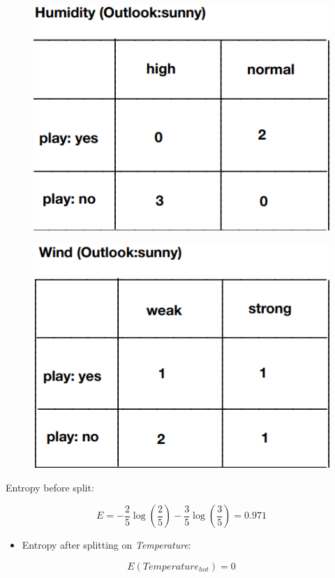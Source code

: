 \documentclass[11pt]{article}
\makeatletter
\def\maxwidth{\ifdim\Gin@nat@width>\linewidth\linewidth
    \else\Gin@nat@width\fi}
\let\Oldincludegraphics\includegraphics
\renewcommand{\includegraphics}[1]{\Oldincludegraphics[width=.8\maxwidth]{#1}}
\providecommand{\tightlist}{%
      \setlength{\itemsep}{0pt}\setlength{\parskip}{0pt}}
\makeatother
\begin{document}
\begin{figure}[H]
\centering
\includegraphics{8.png}
\caption{}
\end{figure}

\begin{figure}[H]
\centering
\includegraphics{9.png}
\caption{}
\end{figure}

Entropy before split:

\[E = -\frac{2}{5} \log (\frac{2}{5}) -  \frac{3}{5} \log (\frac{3}{5}) = 0.971\]

\begin{itemize}
\tightlist
\item
  Entropy after splitting on \emph{Temperature}:
\end{itemize}

\[E(Temperature_{hot}) = 0\]
\end{document}
